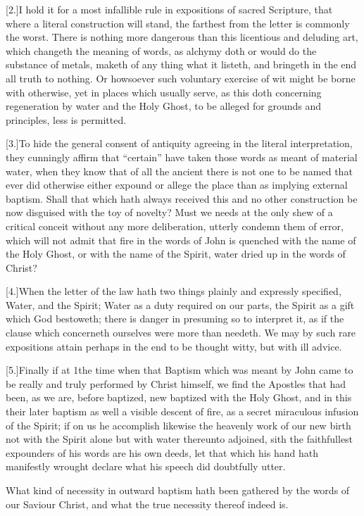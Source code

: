 [2.]I hold it for a most infallible rule in expositions of sacred Scripture, that where a literal construction will stand, the farthest from the letter is commonly the worst. There is nothing more dangerous than this licentious and deluding art, which changeth the meaning of words, as alchymy doth or would do the substance of metals, maketh of any thing what it listeth, and bringeth in the end all truth to nothing. Or howsoever such voluntary exercise of wit might be borne with otherwise, yet in places which usually serve, as this doth concerning regeneration by water and the Holy Ghost, to be alleged for grounds and principles, less is permitted.

[3.]To hide the general consent of antiquity agreeing in the literal interpretation, they cunningly affirm that “certain” have taken those words as meant of material water, when they know that of all the ancient there is not one to be named that ever did otherwise either expound or allege the place than as implying external baptism. Shall that which hath always received this and no other construction be now disguised with the toy of novelty? Must we needs at the only shew of a critical conceit without any more deliberation, utterly condemn them of error, which will not admit that fire in the words of John is quenched with the name of the Holy Ghost, or with the name of the Spirit, water dried up in the words of Christ?

[4.]When the letter of the law hath two things plainly and expressly specified, Water, and the Spirit; Water as a duty  required on our parts, the Spirit as a gift which God bestoweth; there is danger in presuming so to interpret it, as if the clause which concerneth ourselves were more than needeth.
 We may by such rare expositions attain perhaps in the end to be thought witty, but with ill advice.

[5.]Finally if at 1the time when that Baptism which was meant by John came to be really and truly performed by Christ himself, we find the Apostles that had been, as we are, before baptized, new baptized with the Holy Ghost, and in this their later baptism as well a visible descent of fire, as a secret miraculous infusion of the Spirit; if on us he accomplish likewise the heavenly work of our new birth not with the Spirit alone but with water thereunto adjoined, sith the faithfullest expounders of his words are his own deeds, let that which his hand hath manifestly wrought declare what his speech did doubtfully utter.


What kind of necessity in outward baptism hath been gathered by the words of our Saviour Christ, and what the true necessity thereof indeed is.
